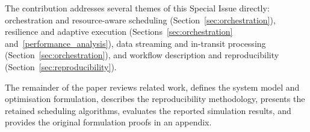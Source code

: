 The contribution addresses several themes of this Special Issue directly: orchestration and
resource-aware scheduling (Section~\ref{sec:orchestration}), resilience and adaptive execution
(Sections~\ref{sec:orchestration} and~\ref{performance_analysis}), data streaming and in-transit
processing (Section~\ref{sec:orchestration}), and workflow description and reproducibility
(Section~\ref{sec:reproducibility}).

The remainder of the paper reviews related work, defines the system model and optimisation formulation, describes the reproducibility methodology, presents the retained scheduling algorithms, evaluates the reported simulation results, and provides the original formulation proofs in an appendix.
